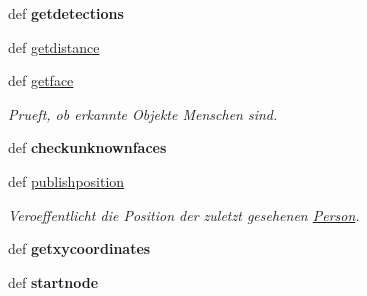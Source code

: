 \begin{DoxyCompactItemize}
\item 
\hypertarget{classpeople2pose_1_1PeopleRec_a22896caa5bdff6528663ba3c7f6d6edf}{def {\bfseries getdetections}}\label{classpeople2pose_1_1PeopleRec_a22896caa5bdff6528663ba3c7f6d6edf}

\item 
def \hyperlink{classpeople2pose_1_1PeopleRec_ae76454d181c018864af7f2913856a863}{getdistance}
\item 
def \hyperlink{classpeople2pose_1_1PeopleRec_af864ebeb87868bc9d64d9b2f51961d88}{getface}
\begin{DoxyCompactList}\small\item\em Prueft, ob erkannte Objekte Menschen sind. \end{DoxyCompactList}\item 
\hypertarget{classpeople2pose_1_1PeopleRec_af243d4e7f14b11142319766e39703509}{def {\bfseries checkunknownfaces}}\label{classpeople2pose_1_1PeopleRec_af243d4e7f14b11142319766e39703509}

\item 
def \hyperlink{classpeople2pose_1_1PeopleRec_a52bbb028f80993699ccd221ac490adb7}{publishposition}
\begin{DoxyCompactList}\small\item\em Veroeffentlicht die Position der zuletzt gesehenen \hyperlink{classpeople2pose_1_1Person}{Person}. \end{DoxyCompactList}\item 
\hypertarget{classpeople2pose_1_1PeopleRec_a248f21d4ae0febce40fa3d62514e87d9}{def {\bfseries getxycoordinates}}\label{classpeople2pose_1_1PeopleRec_a248f21d4ae0febce40fa3d62514e87d9}

\item 
\hypertarget{classpeople2pose_1_1PeopleRec_abceaea81a52f2cb34732bb7daf3034ce}{def {\bfseries startnode}}\label{classpeople2pose_1_1PeopleRec_abceaea81a52f2cb34732bb7daf3034ce}

\end{DoxyCompactItemize}
